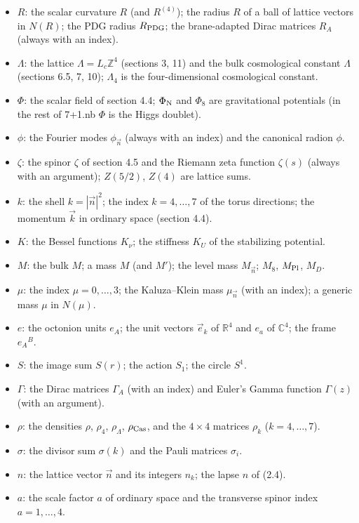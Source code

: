 \documentclass[10pt,a4paper]{article}
\begin{document}
\begin{itemize}
\item $R$: the scalar curvature $R$ (and $R^{(4)}$); the radius $R$ of a ball of lattice vectors in $N(R)$; the PDG radius $R_{\rm PDG}$; the brane-adapted Dirac matrices $R_A$ (always with an index).
\item $\Lambda$: the lattice $\Lambda=L_c\mathbb Z^4$ (sections 3, 11) and the bulk cosmological constant $\Lambda$ (sections 6.5, 7, 10); $\Lambda_4$ is the four-dimensional cosmological constant.
\item $\Phi$: the scalar field of section 4.4; $\Phi_{\rm N}$ and $\Phi_8$ are gravitational potentials (in the rest of 7+1.nb $\Phi$ is the Higgs doublet).
\item $\phi$: the Fourier modes $\phi_{\vec n}$ (always with an index) and the canonical radion $\phi$.
\item $\zeta$: the spinor $\zeta$ of section 4.5 and the Riemann zeta function $\zeta(s)$ (always with an argument); $Z(5/2)$, $Z(4)$ are lattice sums.
\item $k$: the shell $k=|\vec n|^2$; the index $k=4,\dots,7$ of the torus directions; the momentum $\vec k$ in ordinary space (section 4.4).
\item $K$: the Bessel functions $K_\nu$; the stiffness $K_U$ of the stabilizing potential.
\item $M$: the bulk $M$; a mass $M$ (and $M'$); the level mass $M_{\vec n}$; $M_8$, $M_{\rm Pl}$, $M_D$.
\item $\mu$: the index $\mu=0,\dots,3$; the Kaluza–Klein mass $\mu_{\vec n}$ (with an index); a generic mass $\mu$ in $N(\mu)$.
\item $e$: the octonion units $e_A$; the unit vectors $\vec e_k$ of $\mathbb R^4$ and $e_a$ of $\mathbb C^4$; the frame $e_A{}^B$.
\item $S$: the image sum $S(r)$; the action $S_1$; the circle $S^1$.
\item $\Gamma$: the Dirac matrices $\Gamma_A$ (with an index) and Euler’s Gamma function $\Gamma(z)$ (with an argument).
\item $\rho$: the densities $\rho$, $\rho_4$, $\rho_\Lambda$, $\rho_{\rm Cas}$, and the $4\times4$ matrices $\rho_k$ ($k=4,\dots,7$).
\item $\sigma$: the divisor sum $\sigma(k)$ and the Pauli matrices $\sigma_i$.
\item $n$: the lattice vector $\vec n$ and its integers $n_k$; the lapse $n$ of (2.4).
\item $a$: the scale factor $a$ of ordinary space and the transverse spinor index $a=1,\dots,4$.

\end{itemize}
\end{document}
